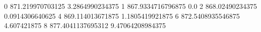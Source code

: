 0 871.219970703125 3.2864990234375
1 867.9334716796875 0.0
2 868.02490234375 0.0914306640625
4 869.114013671875 1.1805419921875
6 872.5408935546875 4.607421875
8 877.4041137695312 9.47064208984375
